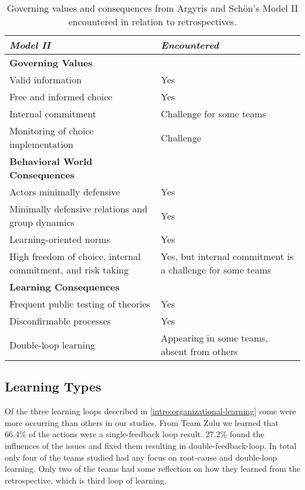 \begin{table}[h]
	\begin{center}
		\caption{Governing values and consequences from Argyris and Schön's Model II encountered in relation to retrospectives.}
		\label{table:model-ii-occurences}
		\begin{tabular}{p{} p{}}
			\hline
			\textit{Model II} & \textit{Encountered} \\
			\hline
			\textbf{Governing Values} & \\
			Valid information & Yes \\
			Free and informed choice & Yes \\
			Internal commitment & Challenge for some teams \\
			Monitoring of choice implementation & Challenge \\
			\hline
			\textbf{Behavioral World Consequences} & \\
			Actors minimally defensive & Yes \\
			Minimally defensive relations and group dynamics & Yes \\
			Learning-oriented norms & Yes \\
			High freedom of choice, internal commitment, and risk taking & Yes, but internal commitment is a challenge for some teams \\
			\hline
			\textbf{Learning Consequences} & \\
			Frequent public testing of theories & Yes \\
			Disconfirmable processes & Yes \\
			Double-loop learning & Appearing in some teams, absent from others \\
			\hline
		\end{tabular}
	\end{center}
\end{table}

\subsection{Learning Types}
\label{discussion:learning-types}
Of the three learning loops described in \autoref{intro:organizational-learning} some were more occurring than others in our studies. From Team Zulu we learned that 66.4\% of the actions were a single-feedback loop result. 27.2\% found the influences of the issues and fixed them resulting in double-feedback-loop. In total only four of the teams studied had any focus on root-cause and double-loop learning. Only two of the teams had some reflection on how they learned from the retrospective, which is third loop of learning.

